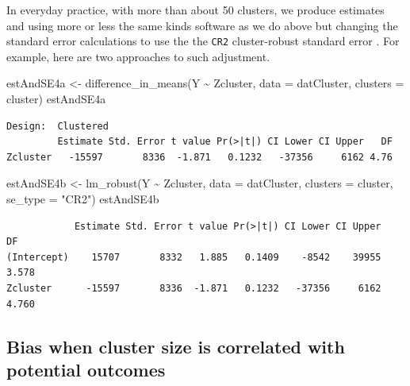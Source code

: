 \documentclass[
  12pt,
]{book}
\newenvironment{Shaded}{\begin{snugshade}}{\end{snugshade}}
\newcommand{\AttributeTok}[1]{\textcolor[rgb]{0.77,0.63,0.00}{#1}}
\newcommand{\FunctionTok}[1]{\textcolor[rgb]{0.00,0.00,0.00}{#1}}
\newcommand{\NormalTok}[1]{#1}
\newcommand{\OtherTok}[1]{\textcolor[rgb]{0.56,0.35,0.01}{#1}}
\newcommand{\SpecialCharTok}[1]{\textcolor[rgb]{0.00,0.00,0.00}{#1}}
\newcommand{\StringTok}[1]{\textcolor[rgb]{0.31,0.60,0.02}{#1}}
\theoremstyle{definition}
\theoremstyle{definition}
\theoremstyle{definition}
\theoremstyle{remark}
\begin{document}
In everyday practice, with more than about 50 clusters, we produce
estimates and using more or less the same kinds software as we do above
but changing the standard error calculations to use the the \texttt{CR2}
cluster-robust standard error \citep{pustejovsky2019cr}. For example,
here are two approaches to such adjustment.

\begin{Shaded}
\begin{Highlighting}[]
\NormalTok{estAndSE4a }\OtherTok{\textless{}{-}} \FunctionTok{difference\_in\_means}\NormalTok{(Y }\SpecialCharTok{\textasciitilde{}}\NormalTok{ Zcluster, }\AttributeTok{data =}\NormalTok{ datCluster, }\AttributeTok{clusters =}\NormalTok{ cluster)}
\NormalTok{estAndSE4a}
\end{Highlighting}
\end{Shaded}

\begin{verbatim}
Design:  Clustered 
         Estimate Std. Error t value Pr(>|t|) CI Lower CI Upper   DF
Zcluster   -15597       8336  -1.871   0.1232   -37356     6162 4.76
\end{verbatim}

\begin{Shaded}
\begin{Highlighting}[]
\NormalTok{estAndSE4b }\OtherTok{\textless{}{-}} \FunctionTok{lm\_robust}\NormalTok{(Y }\SpecialCharTok{\textasciitilde{}}\NormalTok{ Zcluster, }\AttributeTok{data =}\NormalTok{ datCluster, }\AttributeTok{clusters =}\NormalTok{ cluster, }\AttributeTok{se\_type =} \StringTok{"CR2"}\NormalTok{)}
\NormalTok{estAndSE4b}
\end{Highlighting}
\end{Shaded}

\begin{verbatim}
            Estimate Std. Error t value Pr(>|t|) CI Lower CI Upper    DF
(Intercept)    15707       8332   1.885   0.1409    -8542    39955 3.578
Zcluster      -15597       8336  -1.871   0.1232   -37356     6162 4.760
\end{verbatim}

\hypertarget{bias-when-cluster-size-is-correlated-with-potential-outcomes}{%
\subsection{Bias when cluster size is correlated with potential
outcomes}\label{bias-when-cluster-size-is-correlated-with-potential-outcomes}}
\end{document}
